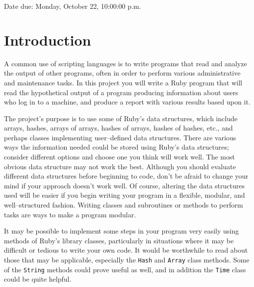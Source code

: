 \documentclass[11pt]{article}
\begin{document}

  \vspace{-3mm}

  \begin{centering}

    Date due: Monday, October 22, 10:00:00 p.m.

  \end{centering}

  \vspace{-6mm}


  \section{Introduction}

    A common use of scripting languages is to write programs that read and
  analyze the output of other programs, often in order to perform various
  administrative and maintenance tasks.  In this project you will write a
  Ruby program that will read the hypothetical output of a program producing
  information about users who log in to a machine, and produce a report with
  various results based upon it.

    The project's purpose is to use some of Ruby's data structures, which
  include arrays, hashes, arrays of arrays, hashes of arrays, hashes of
  hashes, etc., and perhaps classes implementing user--defined data
  structures.  There are various ways the information needed could be stored
  using Ruby's data structures; consider different options and choose one
  you think will work well.  The most obvious data structure may not work
  the best.  Although you should evaluate different data structures before
  beginning to code, don't be afraid to change your mind if your approach
  doesn't work well.  Of course, altering the data structures used will be
  easier if you begin writing your program in a flexible, modular, and
  well--structured fashion.  Writing classes and subroutines or methods to
  perform tasks are ways to make a program modular.

    It may be possible to implement some steps in your program very easily
  using methods of Ruby's library classes, particularly in situations where
  it may be difficult or tedious to write your own code.  It would be
  worthwhile to read about those that may be applicable, especially the
  \texttt{Hash} and \texttt{Array} class methods.  Some of the
  \texttt{String} methods could prove useful as well, and in addition the
  \texttt{Time} class could be quite helpful.
\end{document}
